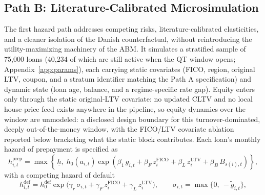 \documentclass[12pt]{article}
\begin{document}
\subsection{Path B: Literature-Calibrated Microsimulation}\label{sec:pathb}

The first hazard path addresses competing risks, literature-calibrated elasticities, and a cleaner isolation of the Danish counterfactual, without reintroducing the utility-maximizing machinery of the ABM. It simulates a stratified sample of 75,000 loans (40,234 of which are still active when the QT window opens; Appendix~\ref{app:params}), each carrying static covariates (FICO, region, original LTV, coupon, and a stratum identifier matching the Path A specification) and dynamic state (loan age, balance, and a regime-specific rate gap). Equity enters only through the static original-LTV covariate: no updated CLTV and no local house-price feed exists anywhere in the pipeline, so equity dynamics over the window are unmodeled: a disclosed design boundary for this turnover-dominated, deeply out-of-the-money window, with the FICO/LTV covariate ablation reported below bracketing what the static block contributes. Each loan's monthly hazard of prepayment is specified as
\begin{equation}\label{eq:pathB}
h^{\mathrm{prep}}_{i,t} = \max\!\left\{\, \underline{h},\; h_0\!\left(a_{i,t}\right) \exp\!\left( \beta_1\, g_{i,t} + \beta_F\, z^{\mathrm{FICO}}_{i} + \beta_L\, z^{\mathrm{LTV}}_{i} + \beta_B\, B_{s(i),t} \right) \right\},
\end{equation}
with a competing hazard of default
\begin{equation}\label{eq:default}
h^{\mathrm{def}}_{i,t} = h^{\mathrm{def}}_0 \exp\!\big( \gamma_r\, \sigma_{i,t} + \gamma_F\, z^{\mathrm{FICO}}_{i} + \gamma_L\, z^{\mathrm{LTV}}_{i} \big), \qquad \sigma_{i,t} = \max\{0,\ -\tilde g_{i,t}\},
\end{equation}
\end{document}
